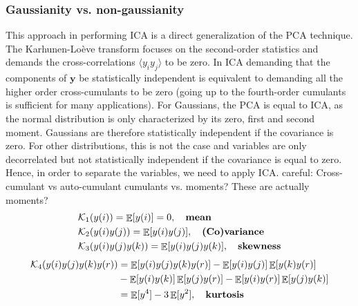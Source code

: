 \documentclass[11pt]{article}
\DeclareMathOperator{\E}{\mathbb{E}}
\begin{document}
\subsubsection{Gaussianity vs. non-gaussianity}
This approach in performing ICA is a direct generalization of the PCA technique. The Karhunen-Lo\`{e}ve transform focuses on the second-order statistics and demands the cross-correlations $\langle y_iy_j \rangle$ to be zero. In ICA demanding that the components of $\mathbf{y}$ be statistically independent is equivalent to demanding all the higher order cross-cumulants to be zero (going up to the fourth-order cumulants is sufficient for many applications).%
For Gaussians, the PCA is equal to ICA, as the normal distribution is only characterized by its zero, first and second moment. Gaussians are therefore statistically independent if the covariance is zero. For other distributions, this is not the case and variables are only decorrelated but not statistically independent if the covariance is equal to zero. Hence, in order to separate the variables, we need to apply ICA.
careful: Cross-cumulant vs auto-cumulant
cumulants vs. moments? These are actually moments?
\begin{align*}
&\mathcal{K}_1(y(i))=\E[y(i)]=0,\quad \text{\textbf{mean}}\\
&\mathcal{K}_2(y(i)y(j))=\E[y(i)y(j)],\quad \text{\textbf{(Co)variance}}\\
&\mathcal{K}_3(y(i)y(j)y(k))=\E[y(i)y(j)y(k)],\quad \text{\textbf{skewness}}
\end{align*}
\begin{align*}
\mathcal{K}_4(y(i)y(j)y(k)y(r))&=\E[y(i)y(j)y(k)y(r)]-\E[y(i)y(j)]\E[y(k)y(r)]\\
&-\E[y(i)y(k)]\E[y(j)y(r)]-\E[y(i)y(r)]\E[y(j)y(k)]\\
&=\E[y^4]-3\E[y^2],\quad \text{\textbf{kurtosis}}
\end{align*}
\end{document}
